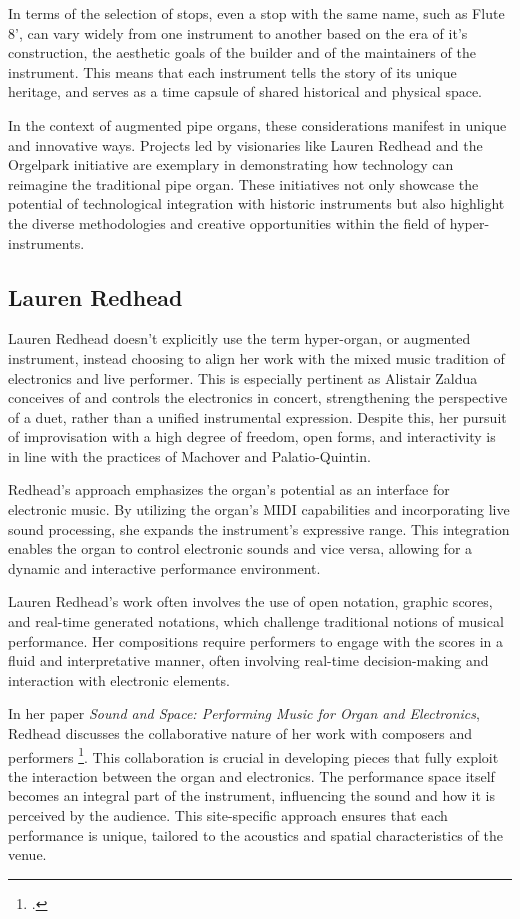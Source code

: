 \documentclass[12pt,twoside,maitrise]{dms_ks}
\theoremstyle{definition}
\begin{document}
In terms of the selection of stops, even a stop with the same name, such as Flute 8', can vary widely from one instrument to another based on the era of it's construction, the aesthetic goals of the builder and of the maintainers of the instrument. 
This means that each instrument tells the story of its unique heritage, and serves as a time capsule of shared historical and physical space.

In the context of augmented pipe organs, these considerations manifest in unique and innovative ways.
Projects led by visionaries like Lauren Redhead and the Orgelpark initiative are exemplary in demonstrating how technology can reimagine the traditional pipe organ.
These initiatives not only showcase the potential of technological integration with historic instruments but also highlight the diverse methodologies and creative opportunities within the field of hyper-instruments.

\subsection{Lauren Redhead}

Lauren Redhead doesn't explicitly use the term hyper-organ, or augmented instrument, instead choosing to align her work with the mixed music tradition of electronics and live performer. This is especially pertinent as Alistair Zaldua conceives of and controls the electronics in concert, strengthening the perspective of a duet, rather than a unified instrumental expression. Despite this, her pursuit of improvisation with a high degree of freedom, open forms, and interactivity is in line with the practices of Machover and Palatio-Quintin.

Redhead's approach emphasizes the organ's potential as an interface for electronic music. By utilizing the organ’s MIDI capabilities and incorporating live sound processing, she expands the instrument’s expressive range. This integration enables the organ to control electronic sounds and vice versa, allowing for a dynamic and interactive performance environment.

Lauren Redhead’s work often involves the use of open notation, graphic scores, and real-time generated notations, which challenge traditional notions of musical performance. Her compositions require performers to engage with the scores in a fluid and interpretative manner, often involving real-time decision-making and interaction with electronic elements.

In her paper \textit{Sound and Space: Performing Music for Organ and Electronics}, Redhead discusses the collaborative nature of her work with composers and performers \footcite[]{redhead_sound_2014}. This collaboration is crucial in developing pieces that fully exploit the interaction between the organ and electronics. The performance space itself becomes an integral part of the instrument, influencing the sound and how it is perceived by the audience. This site-specific approach ensures that each performance is unique, tailored to the acoustics and spatial characteristics of the venue.
\end{document}
